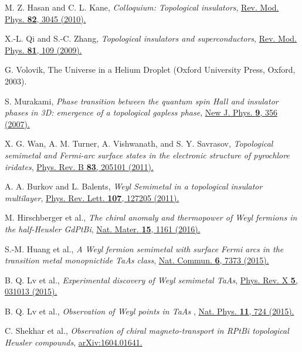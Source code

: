 \documentclass[aps,prl,floatfix,twocolumn,reprint]{revtex4}
\begin{document}
\begin{thebibliography}{99}
 M. Z. Hasan and C. L. Kane, \textit{Colloquium:
Topological insulators}, \href{https://doi.org/10.1103/RevModPhys.82.3045}{%
Rev. Mod. Phys. \textbf{82}, 3045 (2010).}

 X.-L. Qi and S.-C. Zhang, \textit{Topological insulators
and superconductors}, \href{https://doi.org/10.1103/RevModPhys.83.1057}{Rev.
Mod. Phys. \textbf{81}, 109 (2009).}

 G. Volovik, The Universe in a Helium Droplet (Oxford
University Press, Oxford, 2003).

 S. Murakami, \textit{Phase transition between the
quantum spin Hall and insulator phases in 3D: emergence of a topological
gapless phase}, \href{https://doi.org/10.1088/1367-2630/9/9/356}{New J.
Phys. \textbf{9}, 356 (2007).}

 X. G. Wan, A. M. Turner, A. Vishwanath, and S. Y.
Savrasov, \textit{Topological semimetal and Fermi-arc surface states in the
electronic structure of pyrochlore iridates}, \href{https://doi.org/10.1103/PhysRevB.83.205101}%
{Phys. Rev. B \textbf{83}, 205101 (2011).}

 A. A. Burkov and L. Balents, \textit{Weyl Semimetal in
a topological insulator multilayer}, \href{https://doi.org/10.1103/PhysRevLett.107.127205}%
{Phys. Rev. Lett. \textbf{107}, 127205 (2011).}

 M. Hirschberger et al., \textit{The chiral anomaly and
thermopower of Weyl fermions in the half-Heusler GdPtBi}, \href{https://doi.org/10.1038/nmat4684}%
{Nat. Mater. \textbf{15}, 1161 (2016).}

 S.-M. Huang et al., \textit{A Weyl fermion semimetal with
surface Fermi arcs in the transition metal monopnictide TaAs class}, \href{https://doi.org/10.1038/ncomms8373}%
{Nat. Commun. \textbf{6}, 7373 (2015).}

 B. Q. Lv et al., \textit{Experimental discovery of Weyl
semimetal TaAs}, \href{https://doi.org/10.1103/PhysRevX.5.031013}{Phys. Rev.
X \textbf{5}, 031013 (2015).}

 B. Q. Lv et al., \textit{Observation of Weyl points in TaAs}%
, \href{https://doi.org/10.1038/nphys3426}{Nat. Phys. \textbf{11}, 724
(2015).}

 C. Shekhar et al., \textit{Observation of chiral
magneto-transport in RPtBi topological Heusler compounds}, \href{https://arxiv.org/abs/1604.01641}%
{arXiv:1604.01641.}


\end{thebibliography}
\end{document}
